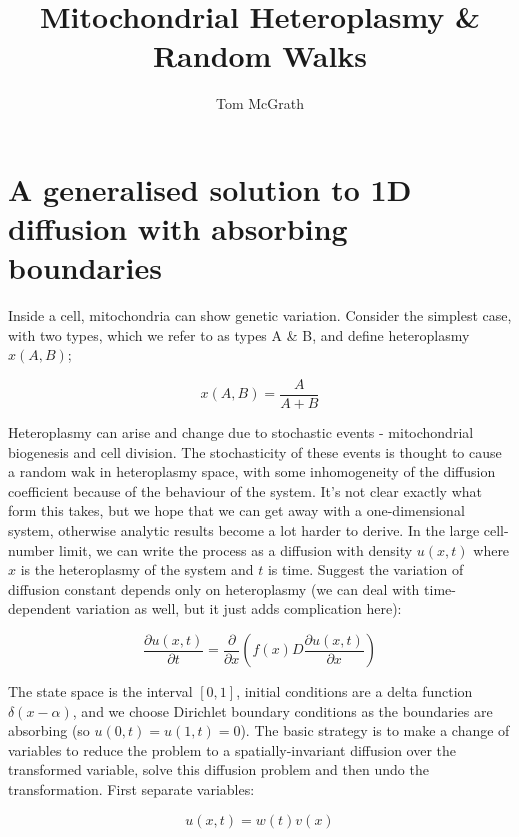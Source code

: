\documentclass[11pt]{article} %
\title{Mitochondrial Heteroplasmy \& Random Walks}
\author{Tom McGrath}
\begin{document}
\maketitle

\section{A generalised solution to 1D diffusion with absorbing boundaries}

Inside a cell, mitochondria can show genetic variation. Consider the simplest case, with two types, which we refer to as types A \& B, and define heteroplasmy $x(A,B)$;

\begin{equation}
x(A, B) = \frac{A}{A+B}
\end{equation}

Heteroplasmy can arise and change due to stochastic events - mitochondrial biogenesis and cell division. The stochasticity of these events is thought to cause a random wak in heteroplasmy space, with some inhomogeneity of the diffusion coefficient because of the behaviour of the system. It's not clear exactly what form this takes, but we hope that we can get away with a one-dimensional system, otherwise analytic results become a lot harder to derive. In the large cell-number limit, we can write the process as a diffusion with density $u(x,t)$ where $x$ is the heteroplasmy of the system and $t$ is time. Suggest the variation of diffusion constant depends only on heteroplasmy (we can deal with time-dependent variation as well, but it just adds complication here):

\begin{equation}
\frac{\partial u(x,t)}{\partial t} = \frac{\partial}{\partial x}\left(f(x)D\frac{\partial u(x,t)}{\partial x}\right)
\end{equation}

The state space is the interval $[0,1]$, initial conditions are a delta function $\delta(x-\alpha)$, and we choose Dirichlet boundary conditions as the boundaries are absorbing (so $u(0,t) = u(1,t) = 0$). The basic strategy is to make a change of variables to reduce the problem to a spatially-invariant diffusion over the transformed variable, solve this diffusion problem and then undo the transformation. First separate variables:

\begin{equation}
u(x,t) = w(t)v(x)
\end{equation}
\end{document}
